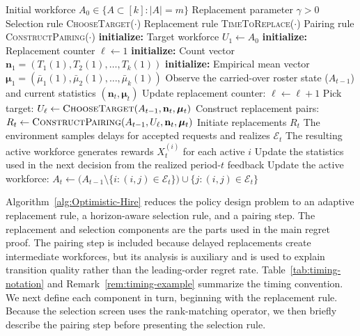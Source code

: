 \documentclass[opre,blindrev]{informs3}
\begin{document}
\begin{algorithm}
    \caption{Optimistic-Hire (\textsc{OH})}
    \label{alg:Optimistic-Hire}
    \begin{algorithmic}[1]
    \Require Initial workforce \(A_0\in \{A\subset [k]: |A|=m\}\) 
    \Require Replacement parameter \(\gamma>0\)
    \Require Selection rule \textsc{ChooseTarget}(\(\cdot\))
    \Require Replacement rule \textsc{TimeToReplace}(\(\cdot\))
    \Require Pairing rule \textsc{ConstructPairing}(\(\cdot\))
    \State \textbf{initialize:} Target workforce \(U_1\gets A_0\)
    \State \textbf{initialize:} Replacement counter \(\ell\gets 1\) 
    \State \textbf{initialize:} Count vector \(\mathbf{n}_1=(T_1(1), T_2(1),\dots,T_k(1))\)
    \State \textbf{initialize:} Empirical mean vector \(\boldsymbol{\mu}_1=(\bar{\mu}_1(1), \bar{\mu}_2(1),\dots,\bar{\mu}_k(1))\)
        \State Observe the carried-over roster state (\(A_{t-1}\)) and current statistics \((\mathbf{n}_{t},\boldsymbol{\mu}_{t})\)
            \State Update replacement counter: \(\ell \gets \ell+1\)
            \State Pick target: \(U_\ell \gets \textsc{ChooseTarget}(A_{t-1}, \mathbf{n}_t, \boldsymbol{\mu}_t)\)
            \State Construct replacement pairs: \(R_t \gets \textsc{ConstructPairing}(A_{t-1},U_\ell, \mathbf{n}_t, \boldsymbol{\mu}_t)\)
            \State Initiate replacements \(R_t\)
        \EndIf
        \State The environment samples delays for accepted requests and realizes \(\mathcal{E}_t\)
        \State The resulting active workforce generates rewards \(X_t^{(i)}\) for each active \(i\)
        \State Update the statistics used in the next decision from the realized period-\(t\) feedback
        \State Update the active workforce: \( A_{t}\gets\big( A_{t-1} \setminus \{  i : (i,j) \in \mathcal{E}_t  \} \big) \cup \{  j : (i,j) \in \mathcal{E}_t  \} \)
    \EndFor
    \end{algorithmic}
\end{algorithm}

Algorithm~\ref{alg:Optimistic-Hire} reduces the policy design problem to an adaptive replacement rule, a horizon-aware selection rule, and a pairing step. The replacement and selection components are the parts used in the main regret proof. The pairing step is included because delayed replacements create intermediate workforces, but its analysis is auxiliary and is used to explain transition quality rather than the leading-order regret rate. Table~\ref{tab:timing-notation} and Remark~\ref{rem:timing-example} summarize the timing convention. We next define each component in turn, beginning with the replacement rule. Because the selection screen uses the rank-matching operator, we then briefly describe the pairing step before presenting the selection rule.
\end{document}

